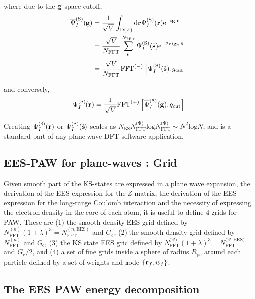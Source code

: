 \documentclass[paper=a4, fontsize=11pt]{article} %
\numberwithin{equation}{section} %
\numberwithin{figure}{section} %
\numberwithin{table}{section} %
\newcommand{\ol}{\overline}
\newcommand{\bs}{{\bf{s}}}
\newcommand{\bg}{{\bf{g}}}
\newcommand{\br}{{\bf{r}}}
\newcommand{\hs}{{\hat{\bf{s}}}}
\newcommand{\rS}{{\mathrm{S}}}
\newcommand{\rEES}{{\mathrm{EES}}}
\newcommand{\rcut}{{\mathrm{cut}}}
\newcommand{\re}{{\mathrm{e}}}
\newcommand{\rd}{{\mathrm{d}}}
\newcommand{\rD}{{\mathrm{D}}}
\newcommand{\rl}{{\mathrm{log}}}
\newcommand{\ibgr}{i\bg\cdot\br}
\newcommand{\gc}{{\bg_c}}
\newcommand{\igcs}{2\pi i\gc\cdot\hat \bs}
\newcommand{\psigs}{{\overline \Psi_I^{(\rS)}(\bg)}}
\newcommand{\NKS}{{N_{\mathrm{KS}}}}
\newcommand{\NFFT}{{N_{\mathrm{FFT}}}}
\newcommand{\NFFTn}{{N^{(n)}_{\mathrm{FFT}}}}
\newcommand{\NFFTp}{{N^{\mathrm{(\Psi})}_{\mathrm{FFT}}}}
\newcommand{\NFFTnEES}{{N^{(n,\rEES)}_{\mathrm{FFT}}}}
\newcommand{\NFFTpEES}{{N^{\mathrm{(\Psi,\rEES})}_{\mathrm{FFT}}}}
\newcommand{\Gc}{{G_{\mathrm{c}}}}
\newcommand{\Rpc}{{R_{\mathrm{pc}}}}
\begin{document}
where due to the $\bg$-space cutoff,
\begin{equation}
\begin{split}
\psigs
&= \frac{1}{\sqrt V} \int _{\rD(V)} \rd \br \Psi_I^{(\rS)}(\br) \re^{-\ibgr} \\
&= \frac{\sqrt{V}} {N_{\mathrm{FFT}}} \sum_{\hs}^\NFFT \Psi_I^{(\rS)}(\hs)\re^{-\igcs} \\
&=\frac{\sqrt{V}} {N_{\mathrm{FFT}}} \mathrm{FFT}^{(-)}\left[\Psi_I^{(\rS)}(\hs), g_\rcut\right]\\
\end{split}
\end{equation}

and conversely,
\begin{equation}
\Psi_I^{(\rS)}(\br) = \frac{1}{\sqrt{V}} \mathrm{FFT}^{(+)}\left[\ol \Psi_I^{(\rS)}(\bg), g_\rcut\right]
\end{equation}



Creating $\Psi_I^{(\rS)}(\br)$ or $\Psi_I^{(\rS)}(\hat \bs)$ scales as $\NKS \NFFTp \rl \NFFTp \sim N^2 \rl N$, and is a standard part of any plane-wave DFT software application.\\

\subsection{EES-PAW for plane-waves : Grid}

Given smooth part of the KS-states are expressed in a plane wave expansion, the derivation of the EES expression for the $Z$-matrix, the derivation of the EES expression for the long-range Coulomb interaction and the necessity of expressing the electron density in the core of each atom, it is useful to define 4 grids for PAW.  These are (1) the smooth density EES grid defined by $\NFFTn(1+\lambda)^3=\NFFTnEES$ and $\Gc$, (2) the smooth density grid defined by $\NFFTn$ and $\Gc$, (3) the KS state EES grid defined by $\NFFTp(1+\lambda)^3=\NFFTpEES$ and $\Gc/2$, and (4) a set of fine grids inside a sphere  of radius $\Rpc$ around each particle defined by a set of weights and node $\{\br_f,w_f\}$. \\

\subsection{The EES PAW energy decomposition}
\end{document}
